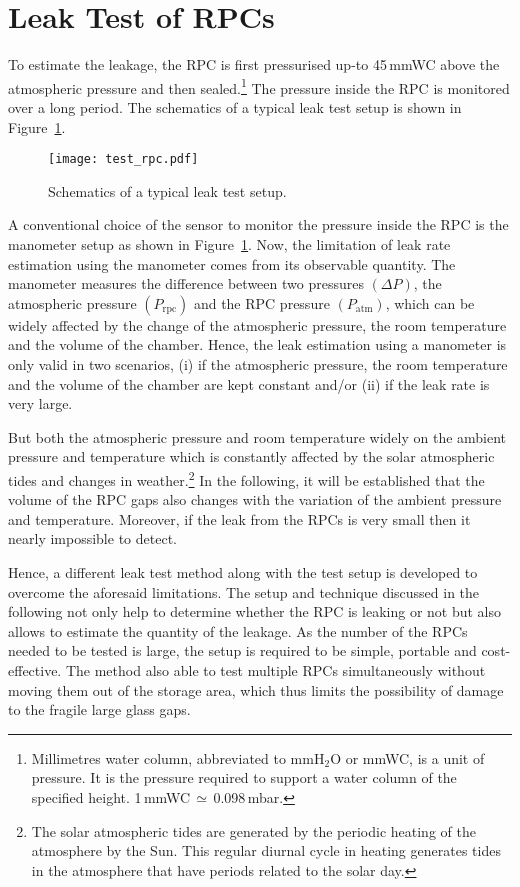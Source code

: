 \section{Leak Test of RPCs}
To estimate the leakage, the RPC is first pressurised up-to 45\,mmWC above the atmospheric pressure and then sealed.\footnote{Millimetres water column, abbreviated to mmH$_2$O or mmWC, is a unit of pressure. It is the pressure required to support a water column of the specified height. 1\,mmWC\,$\simeq$\,0.098\,mbar.} The pressure inside the RPC is monitored over a long period. The schematics of a typical leak test setup is shown in Figure~\ref{fig:test_rpc}. 
\begin{figure}
  \centering
  \texttt{[image: test\_rpc.pdf]}
  \caption{Schematics of a typical leak test setup.}
  \label{fig:test_rpc}
\end{figure}
A conventional choice of the sensor to monitor the pressure inside the RPC is the manometer setup as shown in Figure~\ref{fig:test_rpc}. Now, the limitation of leak rate estimation using the manometer comes from its observable quantity. The manometer measures the difference between two pressures $\left(\Delta P\right)$, the atmospheric pressure $\left(P_{\mathrm{rpc}}\right)$ and the RPC pressure $\left(P_{\mathrm{atm}}\right)$, which can be widely affected by the change of the atmospheric pressure, the room temperature and the volume of the chamber. Hence, the leak estimation using a manometer is only valid in two scenarios, (i) if the atmospheric pressure, the room temperature and the volume of the chamber are kept constant and/or (ii) if the leak rate is very large.

But both the atmospheric pressure and room temperature widely on the ambient pressure and temperature which is constantly affected by the solar atmospheric tides and changes in weather.\footnote{The solar atmospheric tides are generated by the periodic heating of the atmosphere by the Sun. This regular diurnal cycle in heating generates tides in the atmosphere that have periods related to the solar day.} In the following, it will be established that the volume of the RPC gaps also changes with the variation of the ambient pressure and temperature. Moreover, if the leak from the RPCs is very small then it nearly impossible to detect.

Hence, a different leak test method along with the test setup is developed to overcome the aforesaid limitations. The setup and technique discussed in the following not only help to determine whether the RPC is leaking or not but also allows to estimate the quantity of the leakage. As the number of the RPCs needed to be tested is large, the setup is required to be simple, portable and cost-effective. The method also able to test multiple RPCs simultaneously without moving them out of the storage area, which thus limits the possibility of damage to the fragile large glass gaps.

